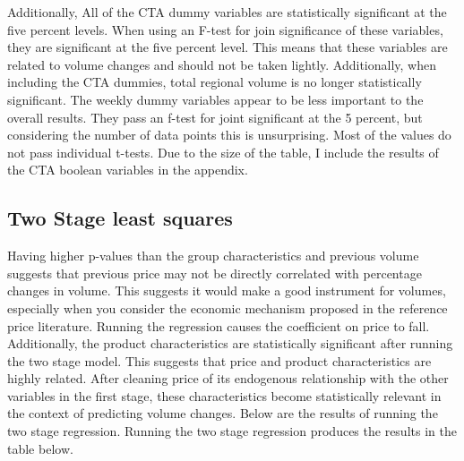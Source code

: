 \documentclass{article}
\begin{document}
Additionally, All of the CTA dummy variables are statistically significant at the five percent levels. When using an F-test for join significance of these variables, they are significant at the five percent level. This means that these variables are related to volume changes and should not be taken lightly. Additionally, when including the CTA dummies, total regional volume is no longer statistically significant. The weekly dummy variables appear to be less important to the overall results. They pass an f-test for joint significant at the 5 percent, but considering the number of data points this is unsurprising. Most of the values do not pass individual t-tests. Due to the size of the table, I include the results of the CTA boolean variables in the appendix.

\subsection{Two Stage least squares}

Having higher p-values than the group characteristics and previous volume suggests that previous price may not be directly correlated with percentage changes in volume. This suggests it would make a good instrument for volumes, especially when you consider the economic mechanism proposed in the reference price literature. Running the regression causes the coefficient on price to fall. Additionally, the product characteristics are statistically significant after running the two stage model. This suggests that price and product characteristics are highly related. After cleaning price of its endogenous relationship with the other variables in the first stage, these characteristics become statistically relevant in the context of predicting volume changes. Below are the results of running the two stage regression. Running the two stage regression produces the results in the table below.
\end{document}
